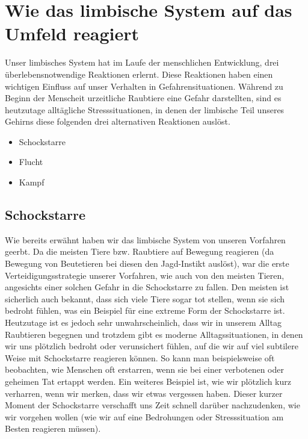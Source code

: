 \section{Wie das limbische System auf das Umfeld reagiert}\label{sec:die-reaktionen-des-limbischen-systems}

Unser limbisches System hat im Laufe der menschlichen Entwicklung, drei überlebensnotwendige Reaktionen erlernt.
Diese Reaktionen haben einen wichtigen Einfluss auf unser Verhalten in Gefahrensituationen. 
Während zu Beginn der Menscheit urzeitliche Raubtiere eine Gefahr darstellten, sind es heutzutage alltägliche Stresssituationen, in denen 
der limbische Teil unseres Gehirns diese folgenden drei alternativen Reaktionen auslöst.

\begin{itemize}
    \item Schockstarre
    \item Flucht
    \item Kampf
\end{itemize}

\subsection{Schockstarre}
Wie bereits erwähnt haben wir das limbische System von unseren Vorfahren geerbt. Da die meisten Tiere bzw.
Raubtiere auf Bewegung reagieren (da Bewegung von Beutetieren bei diesen den Jagd-Instikt auslöst), war
die erste Verteidigungsstrategie unserer Vorfahren, wie auch von den meisten Tieren, angesichts einer solchen Gefahr in die Schockstarre 
zu fallen. Den meisten ist sicherlich auch bekannt, dass sich viele Tiere sogar tot stellen, wenn sie sich bedroht fühlen,
was ein Beispiel für eine extreme Form der Schockstarre ist. 
Heutzutage ist es jedoch sehr unwahrscheinlich, dass wir in unserem Alltag Raubtieren begegnen und trotzdem
gibt es moderne Alltagssituationen, in denen wir uns plötzlich bedroht oder verunsichert fühlen, auf die wir auf viel
subtilere Weise mit Schockstarre reagieren können. 
So kann man beispielsweise oft beobachten, wie Menschen oft erstarren, wenn sie bei einer
verbotenen oder geheimen Tat ertappt werden. Ein weiteres Beispiel ist, wie wir plötzlich kurz verharren, wenn wir
merken, dass wir etwas vergessen haben. Dieser kurzer Moment der Schockstarre verschafft uns Zeit schnell darüber nachzudenken,
wie wir vorgehen wollen (wie wir auf eine Bedrohungen oder Stresssituation am Besten reagieren müssen). 


